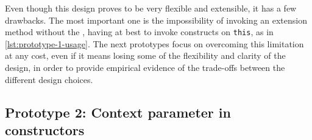 



Even though this design proves to be very flexible and extensible, it has a few drawbacks.
%
The most important one is the impossibility of invoking an extension method without the , having at best to invoke constructs on \texttt{this}, as in \cref{lst:prototype-1-usage}.
%
The next prototypes focus on overcoming this limitation at any cost, even if it means losing some of the flexibility and clarity of the design, in order to provide empirical evidence of the trade-offs between the different design choices.





\subsection{Prototype 2: Context parameter in constructors} \label{chap:design->sec:dsl->subsec:prototype-2-implicit-parameter-in-constructors}

